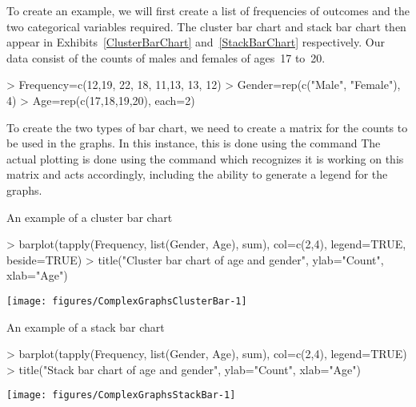 To create an example, we will first create a list of frequencies of outcomes and the two categorical variables required. The cluster bar chart and stack bar chart then appear in Exhibits~\ref{ClusterBarChart} and~\ref{StackBarChart} respectively. Our data consist of the counts of males and females of ages~17 to~20.
\begin{Schunk}
\begin{Sinput}
> Frequency=c(12,19, 22, 18, 11,13, 13, 12)
> Gender=rep(c("Male", "Female"), 4)
> Age=rep(c(17,18,19,20), each=2)
\end{Sinput}
\end{Schunk}
To create the two types of bar chart, we need to create a matrix for the counts to be used in the graphs. In this instance, this is done using the  command The actual plotting is done using the  command which recognizes it is working on this matrix and acts accordingly, including the ability to generate a legend for the graphs.
\begin{exhibit}
\begin{center}
\caption{An example of a cluster bar chart}
\label{ClusterBarChart}
\begin{Schunk}
\begin{Sinput}
> barplot(tapply(Frequency, list(Gender, Age), sum), col=c(2,4), legend=TRUE, beside=TRUE)
> title("Cluster bar chart of age and gender", ylab="Count", xlab="Age")
\end{Sinput}

\texttt{[image: figures/ComplexGraphsClusterBar-1]} \end{Schunk}
\end{center}
\end{exhibit}
\begin{exhibit}
\begin{center}
\caption{An example of a stack bar chart}
\label{StackBarChart}
\begin{Schunk}
\begin{Sinput}
> barplot(tapply(Frequency, list(Gender, Age), sum), col=c(2,4), legend=TRUE)
> title("Stack bar chart of age and gender", ylab="Count", xlab="Age")
\end{Sinput}

\texttt{[image: figures/ComplexGraphsStackBar-1]} \end{Schunk}
\end{center}
\end{exhibit}




